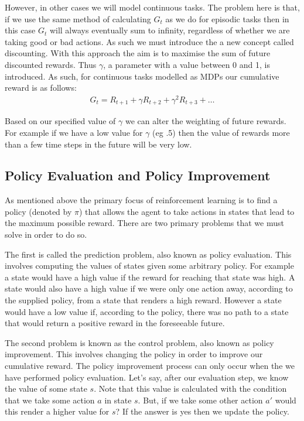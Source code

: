 However, in other cases we will model continuous tasks.
The problem here is that, if we use the same method of calculating $G_t$ as we do for
episodic tasks then in this case $G_t$ will always eventually sum to infinity, regardless
of whether we are taking good or bad actions.
As such we must introduce the a new concept called discounting.
With this approach the aim is to maximise the sum of future discounted rewards.
Thus $\gamma$, a parameter with a value between 0 and 1, is introduced.
As such, for continuous tasks modelled as MDPs our cumulative reward is as follows:
\begin{align}
    G_t = R_{t+1}+\gamma R_{t+2}+\gamma^{2}R_{t+3}+\dots
\end{align}

Based on our specified value of $\gamma$ we can alter the weighting of future rewards.
For example if we have a low value for $\gamma$ (eg .5) then the value of rewards more than a
few time steps in the future will be very low.

\subsection{Policy Evaluation and Policy Improvement}\label{subsec:policyEvalPolicyImp}
As mentioned above the primary focus of reinforcement learning is to find a policy (denoted by $\pi$) that allows
the agent to take actions in states that lead to the maximum possible reward.
There are two primary problems that we must solve in order to do so.

The first is called the prediction problem, also known as policy evaluation.
This involves computing the values of states given some arbitrary policy\citep{sutton1998reinforcement}.
For example a state would have a high value if the reward for reaching that state was high.
A state would also have a high value if we were only one action away, according to the supplied policy,
from a state that renders a high reward.
However a state would have a low value if, according to the policy, there was no path to a state that
would return a positive reward in the foreseeable future.

The second problem is known as the control problem, also known as policy improvement.
This involves changing the policy in order to improve our cumulative reward.
The policy improvement process can only occur when the we have performed policy evaluation.
Let's say, after our evaluation step, we know the value of some state $s$.
Note that this value is calculated with the condition that we take some action $a$ in state $s$.
But, if we take some other action $a'$ would this render a higher value for $s$?
If the answer is yes then we update the policy.


